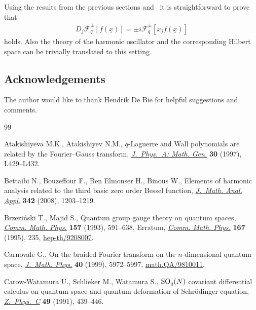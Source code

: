 \documentclass[pdftex]{sigma}
\newcommand{\cF}{\mathcal{F}}
\newcommand{\ux}{\underline{x}}
\numberwithin{equation}{section}
\begin{document}
Using the results from the previous sections and~\cite{MR2595267} it is straightforward to prove that
\begin{gather*}
D_j\overline{\cF}^{\pm }_q[f(\ux)] = \pm i\overline{\cF}^{\pm}_q[x_jf(\ux)]
\end{gather*}
holds. Also the theory of the harmonic oscillator and the corresponding Hilbert space can be trivially translated to this setting.


\subsection*{Acknowledgements}
The author would like to thank Hendrik De Bie for helpful suggestions and comments.


\begin{thebibliography}{99}

\footnotesize\itemsep=0pt

Atakishiyeva M.K., Atakishiyev N.M.,
$q$-Laguerre and Wall polynomials are related by the Fourier--Gauss transform,
\href{http://dx.doi.org/10.1088/0305-4470/30/13/001}{{\it J.~Phys.~A: Math. Gen.}} {\bf 30} (1997), L429--L432.


Bettaibi N., Bouzef\/four F., Ben Elmonser H., Binous W.,
Elements of harmonic analysis related to the third basic zero order Bessel function,
\href{http://dx.doi.org/10.1016/j.jmaa.2008.01.006}{{\it J.~Math. Anal. Appl.}} {\bf 342} (2008),   1203--1219.

Brzezi\'nski T., Majid S.,
 Quantum group gauge theory on quantum spaces,
\href{http://dx.doi.org/10.1007/BF02096884}{{\it Comm. Math. Phys.}} {\bf157} (1993),   591--638,
Erratum, %
\href{http://dx.doi.org/10.1007/BF02099359}{{\it Comm. Math. Phys.}} {\bf 167} (1995),  235,
\href{http://arxiv.org/abs/hep-th/9208007}{hep-th/9208007}.

Carnovale G.,
On the braided Fourier transform on the $n$-dimensional quantum space,
\href{http://dx.doi.org/10.1063/1.533065}{{\it J.~Math. Phys.}} {\bf 40} (1999), 5972--5997,
\href{http://arxiv.org/abs/math.QA/9810011}{math.QA/9810011}.


Carow-Watamura U., Schlieker M., Watamura S.,
${\rm SO}\sb q(N)$ covariant dif\/ferential calculus on quantum space and quantum deformation of Schr\"odinger equation,
\href{http://dx.doi.org/10.1007/BF01549697}{{\it Z.~Phys.~C}} {\bf 49} (1991), 439--446.


\end{thebibliography}
\end{document}
